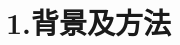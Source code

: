 \documentclass[9pt,t]{beamer} %
\begin{document}

\section{1.背景及方法}

\begin{frame}
\tableofcontents[currentsection] 
\end{frame}

\end{document}
